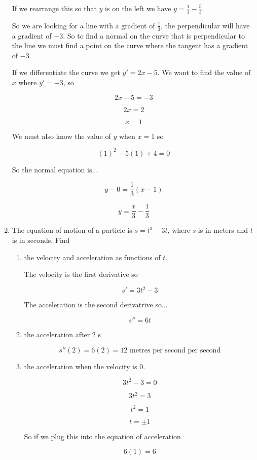 \documentclass{article}
\begin{document}
\begin{enumerate}
			If we rearrange this so that $y$ is on the left we have $y = \frac{1}{3} - \frac{5}{3}$.

			So we are looking for a line with a gradient of $\frac{1}{3}$, the perpendicular will
			have a gradient of $-3$. So to find a normal on the curve that is perpendicular to
			the line we must find a point on the curve where the tangent has a gradient of $-3$.

			If we differentiate the curve we get $y' = 2x - 5$. We want to find the value of $x$
			where $y' = -3$, so

			$$2x - 5 = -3$$

			$$2x = 2$$

			$$x = 1$$

			We must also know the value of $y$ when $x = 1$ so

			$$(1)^2 - 5(1) + 4 = 0$$

			So the normal equation is...

			$$y - 0 = \frac{1}{3}(x - 1)$$

			$$y = \frac{x}{3} - \frac{1}{3}$$


		\item The equation of motion of a particle is $s = t^3 - 3t$, where $s$ is in meters and
			$t$ is in seconds. Find

		\begin{enumerate}
			\item the velocity and acceleration as functions of $t$.

			The velocity is the first derivative so

			$$s' = 3t^2 - 3$$

			The acceleration is the second derivatrive so...

			$$s'' = 6t$$

			\item the acceleration after 2 s

			$$s''(2) = 6(2) = 12 \text{ metres per second per second}$$

			\item the acceleration when the velocity is 0.

				$$3t^2 - 3 = 0$$

				$$3t^2 = 3$$

				$$t^2 = 1$$

				$$t = \pm 1$$

				So if we plug this into the equation of acceleration

				$$6(1) = 6$$
		\end{enumerate}


\end{enumerate}
\end{document}
